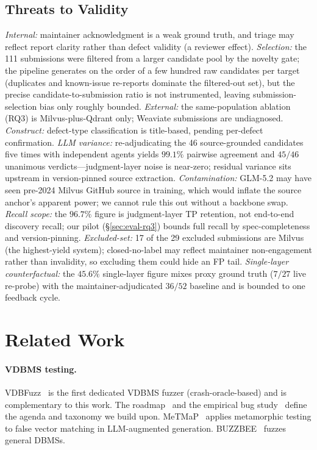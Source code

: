 \documentclass[sigconf]{acmart}
\begin{document}
\subsection{Threats to Validity}
\emph{Internal:} maintainer acknowledgment is a weak ground truth, and triage may reflect report clarity rather than defect validity (a reviewer effect). \emph{Selection:} the 111 submissions were filtered from a larger candidate pool by the novelty gate; the pipeline generates on the order of a few hundred raw candidates per target (duplicates and known-issue re-reports dominate the filtered-out set), but the precise candidate-to-submission ratio is not instrumented, leaving submission-selection bias only roughly bounded. \emph{External:} the same-population ablation (RQ3) is Milvus-plus-Qdrant only; Weaviate submissions are undiagnosed. \emph{Construct:} defect-type classification is title-based, pending per-defect confirmation. \emph{LLM variance:} re-adjudicating the 46 source-grounded candidates five times with independent agents yields $99.1\%$ pairwise agreement and $45/46$ unanimous verdicts---judgment-layer noise is near-zero; residual variance sits upstream in version-pinned source extraction. \emph{Contamination:} GLM-5.2 may have seen pre-2024 Milvus GitHub source in training, which would inflate the source anchor's apparent power; we cannot rule this out without a backbone swap. \emph{Recall scope:} the $96.7\%$ figure is judgment-layer TP retention, not end-to-end discovery recall; our pilot (\S\ref{sec:eval-rq3}) bounds full recall by spec-completeness and version-pinning. \emph{Excluded-set:} 17 of the 29 excluded submissions are Milvus (the highest-yield system); closed-no-label may reflect maintainer non-engagement rather than invalidity, so excluding them could hide an FP tail. \emph{Single-layer counterfactual:} the $45.6\%$ single-layer figure mixes proxy ground truth ($7/27$ live re-probe) with the maintainer-adjudicated $36/52$ baseline and is bounded to one feedback cycle.

\section{Related Work}\label{sec:rw}
\paragraph{VDBMS testing.} VDBFuzz~\cite{vdbfuzz26} is the first dedicated VDBMS fuzzer (crash-oracle-based) and is complementary to this work. The roadmap~\cite{roadmap25} and the empirical bug study~\cite{bugstudy25} define the agenda and taxonomy we build upon. MeTMaP~\cite{metmap24} applies metamorphic testing to false vector matching in LLM-augmented generation. BUZZBEE~\cite{buzzbee24} fuzzes general DBMSs.
\end{document}
